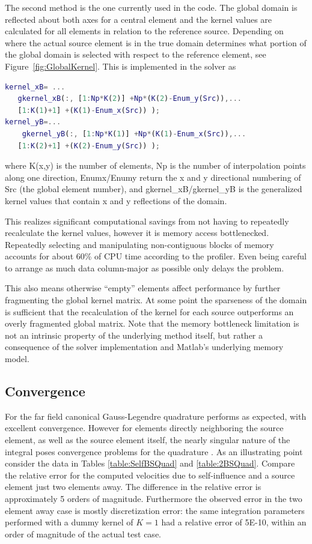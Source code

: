 \documentclass[letterpaper,12pt]{report}
\begin{document}
The second method is the one currently used in the code. The global domain is reflected about both axes for a central element and the kernel values are calculated for all elements in relation to the reference source. Depending on where the actual source element is in the true domain determines what portion of the global domain is selected with respect to the reference element, see Figure~\ref{fig:GlobalKernel}. This is implemented in the solver as

\singlespacing
\begin{lstlisting}[language=Matlab]
kernel_xB= ...
   gkernel_xB(:, [1:Np*K(2)] +Np*(K(2)-Enum_y(Src)),...
   [1:K(1)+1] +(K(1)-Enum_x(Src)) );
kernel_yB=...
    gkernel_yB(:, [1:Np*K(1)] +Np*(K(1)-Enum_x(Src)),...
   [1:K(2)+1] +(K(2)-Enum_y(Src)) );
\end{lstlisting}
\doublespacing

where K(x,y) is the number of elements, Np is the number of interpolation points along one direction, Enumx/Enumy return the x and y directional numbering of Src (the global element number), and gkernel\_xB/gkernel\_yB is the generalized kernel values that contain x and y reflections of the domain.

This realizes significant computational savings from not having to repeatedly recalculate the kernel values, however it is memory access bottlenecked. Repeatedly selecting and manipulating non-contiguous blocks of memory accounts for about 60\% of CPU time according to the profiler. Even being careful to arrange as much data column-major as possible only delays the problem.

This also means otherwise ``empty'' elements affect performance by further fragmenting the global kernel matrix. At some point the sparseness of the domain is sufficient that the recalculation of the kernel for each source outperforms an overly fragmented global matrix. Note that the memory bottleneck limitation is not an intrinsic property of the underlying method itself, but rather a consequence of the solver implementation and Matlab's underlying memory model.

\subsection{Convergence}
For the far field canonical Gauss-Legendre quadrature performs as expected, with excellent convergence. However for elements directly neighboring the source element, as well as the source element itself, the nearly singular nature of the integral poses convergence problems for the quadrature \cite{Strain1996}. As an illustrating point consider the data in Tables \ref{table:SelfBSQuad} and \ref{table:2BSQuad}. Compare the relative error for the computed velocities due to self-influence and a source element just two elements away. The difference in the relative error is approximately 5 orders of magnitude. Furthermore the observed error in the two element away case is mostly discretization error: the same integration parameters performed with a dummy kernel of $K=1$ had a relative error of 5E-10, within an order of magnitude of the actual test case.
\end{document}
